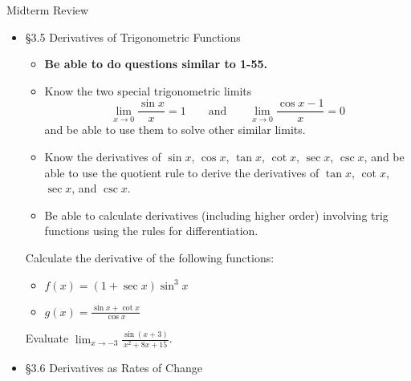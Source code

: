 \documentclass[cal1spr16Lectures.tex]{subfiles}
\begin{document}
\begin{frame}[allowframebreaks]{Midterm Review}
\begin{itemize}
{\bf Note:} Functions are not always given by a formula.  When faced with a problem where you don't know where to start, go through the rules first.
%
\framebreak
\begin{exe} Suppose you have the following information about the functions $f$ and $g$:
\[f(1)=6\quad f'(1)=2\quad g(1)=2\quad g'(1)=3\]
\vspace{-1pc}	
	\begin{itemize}\footnotesize
	\item Let $F=2f+3g$.  What is $F(1)$?  What is $F'(1)$?
	\item Let $G=fg$.  What is $G(1)$?  What is $G'(1)$?
	\end{itemize}
\end{exe}
%
\framebreak
\item \S 3.5 Derivatives of Trigonometric Functions
	\begin{itemize}\footnotesize
	\item {\bf Be able to do questions similar to 1-55.}
	\item Know the two special trigonometric limits
	\vspace{-0.5pc}
	\[\lim_{x\to 0}\frac{\sin x}{x}=1\qquad\text{and}\qquad\lim_{x\to 0}\frac{\cos x-1}{x}=0\]
	and be able to use them to solve other similar limits.
	\item Know the derivatives of $\sin x$, $\cos x$, $\tan x$, $\cot x$, $\sec x$, $\csc x$, and be able to use the quotient rule to derive the derivatives of $\tan x$, $\cot x$, $\sec x$, and $\csc x$.
	\item Be able to calculate derivatives (including higher order) involving trig functions using the rules for differentiation.
	\end{itemize}
%
\framebreak
\begin{exe}
Calculate the derivative of the following functions:
\begin{itemize}
\item $f(x)=(1+\sec x)\sin^3x$
%
\item $g(x)=\displaystyle\frac{\sin x+\cot x}{\cos x}$
\end{itemize}
\end{exe}
%
%
\begin{exe} Evaluate $\displaystyle\lim_{x\to -3}\frac{\sin{(x+3)}}{x^2+8x+15}$. \end{exe}
%
%
\framebreak
\item \S 3.6 Derivatives as Rates of Change

\end{itemize}
\end{frame}
\end{document}
